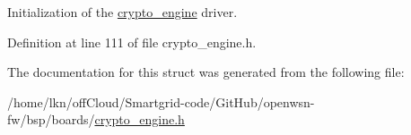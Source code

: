 Initialization of the \hyperlink{structcrypto__engine}{crypto\+\_\+engine} driver. 



Definition at line 111 of file crypto\+\_\+engine.\+h.



The documentation for this struct was generated from the following file\+:\begin{DoxyCompactItemize}
\item 
/home/lkn/off\+Cloud/\+Smartgrid-\/code/\+Git\+Hub/openwsn-\/fw/bsp/boards/\hyperlink{crypto__engine_8h}{crypto\+\_\+engine.\+h}\end{DoxyCompactItemize}
